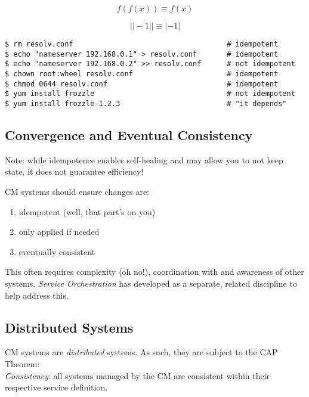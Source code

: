 \documentclass[xga]{xdvislides}
\begin{document}
\begin{displaymath}
f(f(x)) \equiv f(x)
\end{displaymath}

\begin{displaymath}
| |-1| | \equiv |-1|
\end{displaymath}

\begin{verbatim}
$ rm resolv.conf                                    # idempotent
$ echo "nameserver 192.168.0.1" > resolv.conf       # idempotent
$ echo "nameserver 192.168.0.2" >> resolv.conf      # not idempotent
$ chown root:wheel resolv.conf                      # idempotent
$ chmod 0644 resolv.conf                            # idempotent
$ yum install frozzle                               # not idempotent
$ yum install frozzle-1.2.3                         # "it depends"
\end{verbatim}

\subsection{Convergence and Eventual Consistency}

Note: while idempotence enables self-healing and may
allow you to not keep state, it does not guarantee
efficiency! \\

\vspace{.5in}

CM systems should ensure changes are:
\begin{enumerate}
	\item idempotent (well, that part's on you)
	\item only applied if needed
	\item eventually consistent
\end{enumerate}
\vspace{.5in}

This often requires complexity (oh no!), coordination
with and awareness of other systems.  {\em Service
Orchestration} has developed as a separate, related
discipline to help address this.

\subsection{Distributed Systems}
CM systems are {\em distributed} systems.  As such,
they are subject to the CAP Theorem: \\

{\em Consistency}: all systems managed by the CM are
consistent within their respective service definition.
\\
\end{document}
